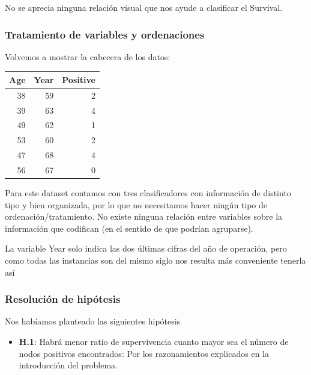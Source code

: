No se aprecia ninguna relación visual que nos ayude a clasificar el Survival.

\subsubsection{Tratamiento de variables y ordenaciones}

Volvemos a mostrar la cabecera de los datos:

\vspace{\baselineskip}

\begin{tabular}{r|r|r}
\hline
Age & Year & Positive\\
\hline
38 & 59 & 2\\
\hline
39 & 63 & 4\\
\hline
49 & 62 & 1\\
\hline
53 & 60 & 2\\
\hline
47 & 68 & 4\\
\hline
56 & 67 & 0\\
\hline
\end{tabular}

\vspace{\baselineskip}

Para este dataset contamos con tres clasificadores con información de distinto tipo y bien organizada, por lo que no necesitamos hacer ningún tipo de ordenación/tratamiento. No existe ninguna relación entre variables sobre la información que codifican (en el sentido de que
podrían agruparse).

La variable Year solo indica las dos últimas cifras del año de operación, pero como todas las instancias son del mismo siglo nos resulta más conveniente tenerla así

\subsubsection{Resolución de hipótesis}

Nos habíamos planteado las siguientes hipótesis

\begin{itemize}
    \item \textbf{H.1}: Habrá menor ratio de supervivencia cuanto mayor sea el número de nodos positivos encontrados: Por los razonamientos explicados en la introducción del problema.
\end{itemize}

